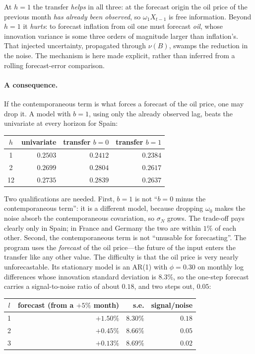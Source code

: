 \documentclass[11pt,a4paper]{article}
\theoremstyle{plain}
\theoremstyle{remark}
\begin{document}
At $h=1$ the transfer \emph{helps} in all three: at the forecast origin the oil
price of the previous month \emph{has already been observed}, so $\omega_1 X_{t-1}$
is free information. Beyond $h=1$ it \emph{hurts}: to forecast inflation from oil
one must forecast \emph{oil}, whose innovation variance is some three orders of
magnitude larger than inflation's. That injected uncertainty, propagated through
$\nu(B)$, swamps the reduction in the noise. The mechanism is here made explicit,
rather than inferred from a rolling forecast-error comparison.

\paragraph{A consequence.} If the contemporaneous term is what forces a forecast of
the oil price, one may drop it. A model with $b=1$, using only the already observed
lag, beats the univariate at every horizon for Spain:

\begin{center}
\begin{tabular}{crrr}
\toprule
$h$ & univariate & transfer $b{=}0$ & transfer $b{=}1$ \\
\midrule
 1 & $0.2503$ & $0.2412$ & $\mathbf{0.2384}$ \\
 2 & $0.2699$ & $0.2804$ & $\mathbf{0.2617}$ \\
12 & $0.2735$ & $0.2839$ & $\mathbf{0.2637}$ \\
\bottomrule
\end{tabular}
\end{center}

Two qualifications are needed. First, $b=1$ is not ``$b=0$ minus the
contemporaneous term'': it is a different model, because dropping $\omega_0$ makes
the noise absorb the contemporaneous covariation, so $\sigma_N$ grows. The trade-off
pays clearly only in Spain; in France and Germany the two are within $1\%$ of each
other. Second, the contemporaneous term is not ``unusable for forecasting''. The
program uses the \emph{forecast} of the oil price---the future of the input enters
the transfer like any other value. The difficulty is that the oil price is very
nearly unforecastable. Its stationary model is
an AR(1) with $\phi=0.30$ on monthly log differences whose innovation standard
deviation is $8.3\%$, so the one-step forecast carries a signal-to-noise ratio of
about $0.18$, and two steps out, $0.05$:

\begin{center}
\begin{tabular}{crrr}
\toprule
$l$ & forecast (from a $+5\%$ month) & s.e. & signal/noise \\
\midrule
1 & $+1.50\%$ & $8.30\%$ & $0.18$ \\
2 & $+0.45\%$ & $8.66\%$ & $0.05$ \\
3 & $+0.13\%$ & $8.69\%$ & $0.02$ \\
\bottomrule
\end{tabular}
\end{center}
\end{document}
